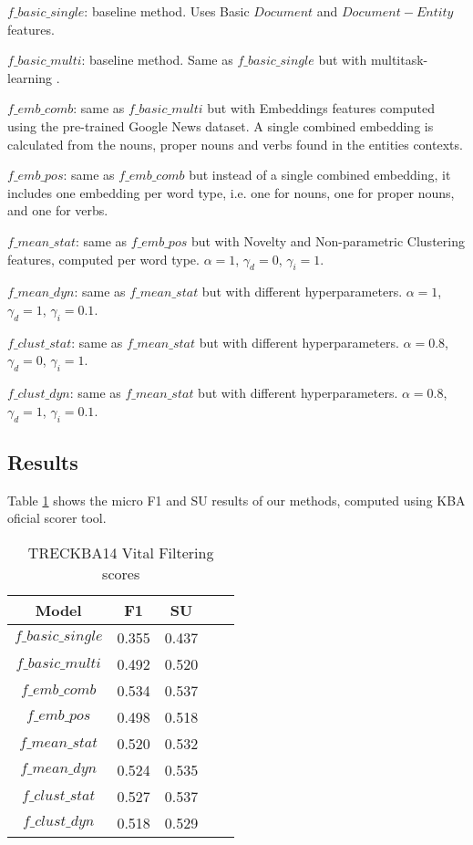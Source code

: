 \documentclass{article}
\begin{document}
\begin{itemize*}
  \item $f\_basic\_single$: baseline method. Uses Basic $Document$ and $Document-Entity$ features.
  \item $f\_basic\_multi$: baseline method. Same as $f\_basic\_single$ but with multitask-learning \cite{Caruana93multitasklearning}.
  \item $f\_emb\_comb$: same as $f\_basic\_multi$ but with Embeddings features computed using the pre-trained Google News dataset. A single combined embedding is calculated from the nouns, proper nouns and verbs found in the entities contexts.
  \item $f\_emb\_pos$: same as $f\_emb\_comb$ but instead of a single combined embedding, it includes one embedding per word type, i.e. one for nouns, one for proper nouns, and one for verbs.
  \item $f\_mean\_stat$: same as $f\_emb\_pos$ but with Novelty and Non-parametric Clustering features, computed per word type. $\alpha = 1$, $\gamma_d = 0$, $\gamma_i = 1$.
  \item $f\_mean\_dyn$: same as $f\_mean\_stat$ but with different hyperparameters. $\alpha = 1$, $\gamma_d = 1$, $\gamma_i = 0.1$.
  \item $f\_clust\_stat$: same as $f\_mean\_stat$ but with different hyperparameters. $\alpha = 0.8$, $\gamma_d = 0$, $\gamma_i = 1$.
  \item $f\_clust\_dyn$: same as $f\_mean\_stat$ but with different hyperparameters. $\alpha = 0.8$, $\gamma_d = 1$, $\gamma_i = 0.1$.
\end{itemize*}

\subsection{Results}

Table \ref{res} shows the micro F1 and SU results of our methods, computed using KBA oficial scorer tool.

\begin{table}[H]
\center
\begin{tabular}{|c|c|c|c|c|} \hline
\textbf{Model} & \textbf{F1} & \textbf{SU} \\ \hline\hline
$f\_basic\_single$ & 0.355 & 0.437 \\ \hline
$f\_basic\_multi$ & 0.492 & 0.520 \\ \hline
$f\_emb\_comb$ & 0.534 & 0.537 \\ \hline
$f\_emb\_pos$ & 0.498 & 0.518 \\ \hline
$f\_mean\_stat$ & 0.520 & 0.532 \\ \hline
$f\_mean\_dyn$ & 0.524 & 0.535 \\ \hline
$f\_clust\_stat$ & 0.527 & 0.537 \\ \hline
$f\_clust\_dyn$ & 0.518 & 0.529 \\ \hline
\end{tabular}
\caption{TRECKBA14 Vital Filtering scores}
\label{res}
\end{table}
\end{document}

